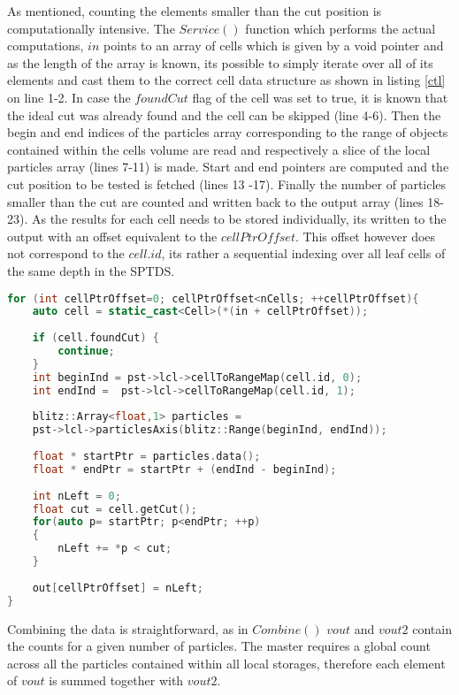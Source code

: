 \documentclass[]{article}
\begin{document}
As mentioned, counting the elements smaller than the cut position is computationally intensive. 
The $Service()$ function which performs the actual computations, $in$ points to an array of cells which is given by a void pointer and as the length of the array is known, its possible to simply iterate over all of its elements and cast them to the correct cell data structure as shown in listing \ref{ctl} on line 1-2. In case the $foundCut$ flag of the cell was set to true, it is known that the ideal cut was already found and the cell can be skipped (line 4-6).
Then the begin and end indices of the particles array corresponding to the range of objects contained within the cells volume are read and respectively a slice of the local particles array (lines 7-11) is made. Start and end pointers are computed and the cut position to be tested is fetched (lines 13 -17). Finally the number of particles smaller than the cut are counted and written back to the output array (lines 18-23). As the results for each cell needs to be stored individually, its written to the output with an offset equivalent to the $cellPtrOffset$. This offset however does not correspond to the $cell.id$, its rather a sequential indexing over all leaf cells of the same depth in the SPTDS. 


\begin{lstlisting}[language=c++, caption=Part of the Count Left Service() method, label=ctl]
for (int cellPtrOffset=0; cellPtrOffset<nCells; ++cellPtrOffset){
	auto cell = static_cast<Cell>(*(in + cellPtrOffset));
	
	if (cell.foundCut) {
		continue;
	}
	int beginInd = pst->lcl->cellToRangeMap(cell.id, 0);
	int endInd =  pst->lcl->cellToRangeMap(cell.id, 1);
	
	blitz::Array<float,1> particles =
	pst->lcl->particlesAxis(blitz::Range(beginInd, endInd));
	
	float * startPtr = particles.data();
	float * endPtr = startPtr + (endInd - beginInd);
	
	int nLeft = 0;
	float cut = cell.getCut();
	for(auto p= startPtr; p<endPtr; ++p)
	{
		nLeft += *p < cut;
	}
	
	out[cellPtrOffset] = nLeft;
}
\end{lstlisting}

Combining the data is straightforward, as in $Combine()$ $vout$ and $vout2$ contain the counts for a given number of particles. The master requires a global count across all the particles contained within all local storages, therefore each element of $vout$ is summed together with $vout2$. 
\end{document}
